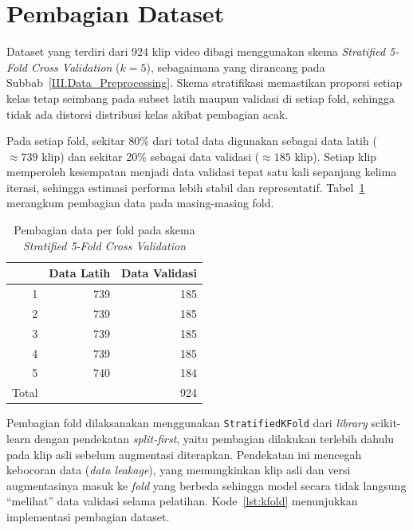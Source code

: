 \section{Pembagian Dataset} \label{IV.Pembagian}

Dataset yang terdiri dari 924 klip video dibagi menggunakan skema \textit{Stratified 5-Fold Cross Validation} ($k=5$), sebagaimana yang dirancang pada Subbab~\ref{III.Data_Preprocessing}. Skema stratifikasi memastikan proporsi setiap kelas tetap seimbang pada subset latih maupun validasi di setiap fold, sehingga tidak ada distorsi distribusi kelas akibat pembagian acak.\par

Pada setiap fold, sekitar 80\% dari total data digunakan sebagai data latih ($\approx739$ klip) dan sekitar 20\% sebagai data validasi ($\approx185$ klip). Setiap klip memperoleh kesempatan menjadi data validasi tepat satu kali sepanjang kelima iterasi, sehingga estimasi performa lebih stabil dan representatif. Tabel~\ref{tab:4.fold_split} merangkum pembagian data pada masing-masing fold.\par

\begin{table}[H]
\centering
\caption{Pembagian data per fold pada skema \textit{Stratified 5-Fold Cross Validation}}
\label{tab:4.fold_split}
{\setlength{\tabcolsep}{3pt}
\footnotesize
\begin{tabular}{|r|r|r|}
\hline
\rowcolor{gray!15} \multicolumn{1}{|c|}{Fold} & \multicolumn{1}{c|}{Data Latih} & \multicolumn{1}{c|}{Data Validasi} \\
\hline
1 & 739 & 185 \\
\hline
2 & 739 & 185 \\
\hline
3 & 739 & 185 \\
\hline
4 & 739 & 185 \\
\hline
5 & 740 & 184 \\
\hline
Total & \multicolumn{2}{r|}{924} \\
\hline
\end{tabular}
}
\end{table}

Pembagian fold dilaksanakan menggunakan \texttt{StratifiedKFold} dari \textit{library} scikit-learn dengan pendekatan \textit{split-first}, yaitu pembagian dilakukan terlebih dahulu pada klip asli sebelum augmentasi diterapkan. Pendekatan ini mencegah kebocoran data (\textit{data leakage}), yang memungkinkan klip asli dan versi augmentasinya masuk ke \textit{fold} yang berbeda sehingga model secara tidak langsung ``melihat'' data validasi selama pelatihan. Kode~\ref{lst:kfold} menunjukkan implementasi pembagian dataset.\par

